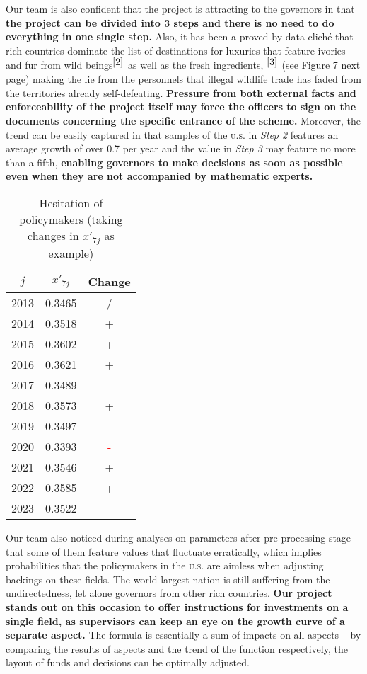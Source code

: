 \documentclass[12pt]{article}
\begin{document}
Our team is also confident that the project is attracting to the governors in that \textbf{the project can be divided into 3 steps and there is no need to do everything in one single step.} Also, it has been a proved-by-data cliché that rich countries dominate the list of destinations for luxuries that feature ivories and fur from wild beings$^{\cite{2}}$ as well as the fresh ingredients, $^{\cite{3}}$ (see Figure 7 next page) making the lie from the personnels that illegal wildlife trade has faded from the territories already self-defeating. \textbf{Pressure from both external facts and enforceability of the project itself may force the officers to sign on the documents concerning the specific entrance of the scheme.} Moreover, the trend can be easily captured in that samples of the \textsc{u.s.} in \textit{Step 2} features an average growth of over 0.7 per year and the value in \textit{Step 3} may feature no more than a fifth, \textbf{enabling governors to make decisions as soon as possible even when they are not accompanied by mathematic experts.}

\begin{wraptable}{r}{0.39\textwidth}
	\centering
	\begin{tabular}{ccc}
		\hline
		$j$&$x'_{7j}$&Change\\
		\hline
		2013 & 0.3465 & \textcolor[rgb]{0.6,0.6,0.6}{/}\\
		2014 & 0.3518 & \textcolor[rgb]{0.1,0.6,0.1}{+}\\
		2015 & 0.3602 & \textcolor[rgb]{0.1,0.6,0.1}{+}\\
		2016 & 0.3621 & \textcolor[rgb]{0.1,0.6,0.1}{+}\\
		2017 & 0.3489 & \textcolor{red}{-}\\
		2018 & 0.3573 & \textcolor[rgb]{0.1,0.6,0.1}{+}\\
		2019 & 0.3497 & \textcolor{red}{-}\\
		2020 & 0.3393 & \textcolor{red}{-}\\
		2021 & 0.3546 & \textcolor[rgb]{0.1,0.6,0.1}{+}\\
		2022 & 0.3585 & \textcolor[rgb]{0.1,0.6,0.1}{+}\\
		2023 & 0.3522 & \textcolor{red}{-}\\
		\hline
	\end{tabular}
\caption{Hesitation of policymakers (taking changes in $x'_{7j}$ as example)}
\end{wraptable}
Our team also noticed during analyses on parameters after pre-processing stage that some of them feature values that fluctuate erratically, which implies probabilities that the policymakers in the \textsc{u.s.} are aimless when adjusting backings on these fields. The world-largest nation is still suffering from the undirectedness, let alone governors from other rich countries. \textbf{Our project stands out on this occasion to offer instructions for investments on a single field, as supervisors can keep an eye on the growth curve of a separate aspect.} The formula is essentially a sum of impacts on all aspects -- by comparing the results of aspects and the trend of the function respectively, the layout of funds and decisions can be optimally adjusted.
\end{document}
